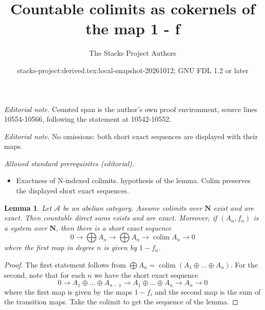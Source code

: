 \documentclass{stacks-project}
\title{Countable colimits as cokernels of the map 1 - f}
\author{The Stacks Project Authors}
\date{stacks-project:derived.tex:local-snapshot-20261012; GNU FDL 1.2 or later}
\theoremstyle{plain}
\newtheorem{lemma}[subsection]{Lemma}
\theoremstyle{definition}
\theoremstyle{remark}
\numberwithin{equation}{subsection}
\def\colim{\mathop{\mathrm{colim}}\nolimits}
\begin{document}
\maketitle
\noindent\textit{Editorial note.} Counted span is the author's own proof environment, source lines 10554-10566, following the statement at 10542-10552.\par\medskip
\noindent\textit{Editorial note.} No omissions: both short exact sequences are displayed with their maps.\par\medskip
\noindent\textit{Allowed standard prerequisites (editorial).}\begin{itemize}
\item Exactness of N-indexed colimits. hypothesis of the lemma. Colim preserves the displayed short exact sequences.
\end{itemize}\medskip
\begin{lemma}
\label{lemma-compute-colimit}
Let $\mathcal{A}$ be an abelian category. Assume colimits over $\mathbf{N}$
exist and are exact. Then countable direct sums exists and are exact.
Moreover, if $(A_n, f_n)$ is a system over $\mathbf{N}$, then there is
a short exact sequence
$$
0 \to \bigoplus A_n \to \bigoplus A_n \to \colim A_n \to 0
$$
where the first map in degree $n$ is given by $1 - f_n$.
\end{lemma}

\begin{proof}
The first statement follows from
$\bigoplus A_n = \colim (A_1 \oplus \ldots \oplus A_n)$.
For the second, note that for each $n$ we have the short exact sequence
$$
0 \to
A_1 \oplus \ldots \oplus A_{n - 1} \to
A_1 \oplus \ldots \oplus A_n \to A_n \to 0
$$
where the first map is given by the maps $1 - f_i$ and the
second map is the sum of the transition maps.
Take the colimit to get the sequence of the lemma.
\end{proof}
\end{document}
